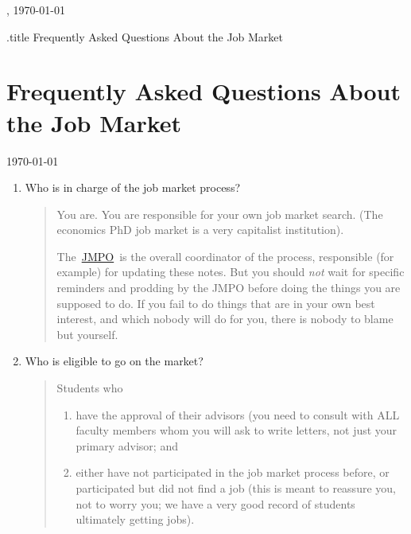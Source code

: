 \documentclass{\classes/econtex}
\begin{document}
\hfill{\tiny \jobname, \today} \vspace{.1in}

\begin{verbatimwrite}{\jobname.title}
  Frequently Asked Questions About the Job Market
\end{verbatimwrite}

\section*{\Large Frequently Asked Questions About the Job Market}\medskip\medskip

\centerline{\today}\medskip\medskip

\begin{enumerate}

\item Who is in charge of the job market process?
  \begin{quote}
    You are.  You are responsible for your own job market search.  (The economics PhD job market is a very capitalist institution).

    The~\href{\Notationpage}{JMPO}~is the overall coordinator of the process, responsible (for example) for updating these notes.  But you should \textit{not} wait for specific reminders and prodding by the JMPO before doing the things you are supposed to do. If you fail to do things that are in your own best interest, and which nobody will do for you, there is nobody to blame but yourself.

  \end{quote}

\item  Who is eligible to go on the market?
  \begin{quote}
    
    Students who

    \begin{enumerate}
      \item have the approval of their advisors (you need to consult with ALL faculty members whom you will ask to
        write letters, not just your primary advisor; and
        \item either have not participated in the job market process before,
    or participated but did not find a job (this is meant to reassure
    you, not to worry you; we have a very good record of students
    ultimately getting jobs).
    \end{enumerate}


\end{quote}
\end{enumerate}
\end{document}
